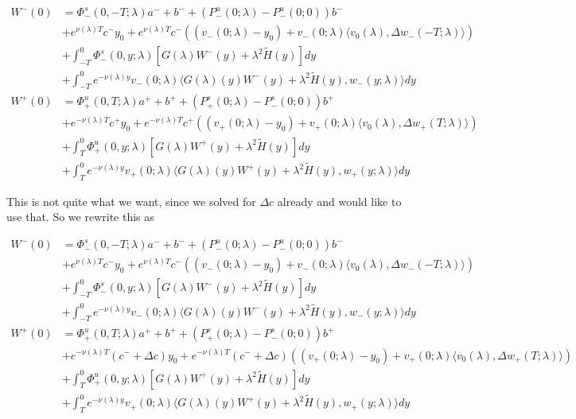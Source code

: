 \documentclass[12pt]{article}
\begin{document}
\begin{enumerate}
\begin{align*}
W^-(0) &= \Phi^s_-(0, -T; \lambda )a^- + b^- + (P^u_-(0; \lambda) - P^u_-(0; 0))b^- \\
&+ e^{\nu(\lambda)T} c^- y_0 + e^{\nu(\lambda)T} c^- ( (v_-(0; \lambda) - y_0) + v_-(0; \lambda) \langle  v_0(\lambda), \Delta w_-(-T; \lambda) \rangle) \\
&+ \int_{-T}^0 \Phi^s_-(0, y; \lambda) [ G(\lambda)W^-(y) + \lambda^2 \tilde{H}(y) ] dy \\
&+ \int_{-T}^0 
e^{-\nu(\lambda)y} v_-(0; \lambda) \langle G(\lambda)(y)W^-(y) + \lambda^2 \tilde{H}(y), w_-(y; \lambda) \rangle dy \\
W^+(0) &= \Phi^u_+(0, T; \lambda)a^+ + b^+ + (P^s_+(0; \lambda) - P^s_-(0; 0))b^+ \\
&+ e^{-\nu(\lambda)T} c^+ y_0 + e^{-\nu(\lambda)T} c^+ ( (v_+(0; \lambda) - y_0) + v_+(0; \lambda) \langle  v_0(\lambda), \Delta w_+(T; \lambda) \rangle) \\
&+ \int_T^0 \Phi^u_+(0, y; \lambda) [ G(\lambda)W^+(y) + \lambda^2 \tilde{H}(y) ] dy \\
&+ \int_T^0 e^{-\nu(\lambda)y} v_+(0; \lambda) \langle G(\lambda)(y)W^+(y) + \lambda^2 \tilde{H}(y), w_+(y; \lambda) \rangle dy
\end{align*}

This is not quite what we want, since we solved for $\Delta c$ already and would like to use that. So we rewrite this as

\begin{align*}
W^-(0) &= \Phi^s_-(0, -T; \lambda )a^- + b^- + (P^u_-(0; \lambda) - P^u_-(0; 0))b^- \\
&+ e^{\nu(\lambda)T} c^- y_0 + e^{\nu(\lambda)T} c^- ( (v_-(0; \lambda) - y_0) + v_-(0; \lambda) \langle  v_0(\lambda), \Delta w_-(-T; \lambda) \rangle) \\
&+ \int_{-T}^0 \Phi^s_-(0, y; \lambda) [ G(\lambda)W^-(y) + \lambda^2 \tilde{H}(y) ] dy \\
&+ \int_{-T}^0 
e^{-\nu(\lambda)y} v_-(0; \lambda) \langle G(\lambda)(y)W^-(y) + \lambda^2 \tilde{H}(y), w_-(y; \lambda) \rangle dy \\
W^+(0) &= \Phi^u_+(0, T; \lambda)a^+ + b^+ + (P^s_+(0; \lambda) - P^s_-(0; 0))b^+ \\
&+ e^{-\nu(\lambda)T} (c^- + \Delta c) y_0 + e^{-\nu(\lambda)T} (c^- + \Delta c) ( (v_+(0; \lambda) - y_0) + v_+(0; \lambda) \langle  v_0(\lambda), \Delta w_+(T; \lambda) \rangle) \\
&+ \int_T^0 \Phi^u_+(0, y; \lambda) [ G(\lambda)W^+(y) + \lambda^2 \tilde{H}(y) ] dy \\
&+ \int_T^0 e^{-\nu(\lambda)y} v_+(0; \lambda) \langle G(\lambda)(y)W^+(y) + \lambda^2 \tilde{H}(y), w_+(y; \lambda) \rangle dy
\end{align*}



\end{enumerate}
\end{document}
